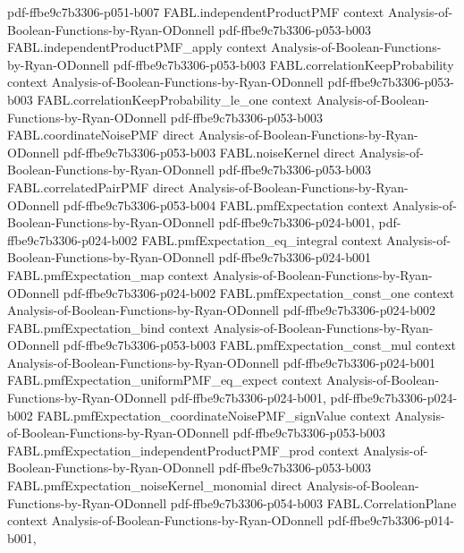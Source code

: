 \begin{theorem}
{    pdf-ffbe9c7b3306-p051-b007}
\proofstep
  {FABL.independentProductPMF}
  {context}
  {Analysis-of-Boolean-Functions-by-Ryan-ODonnell}
  {pdf-ffbe9c7b3306-p053-b003}
\proofstep
  {FABL.independentProductPMF_apply}
  {context}
  {Analysis-of-Boolean-Functions-by-Ryan-ODonnell}
  {pdf-ffbe9c7b3306-p053-b003}
\proofstep
  {FABL.correlationKeepProbability}
  {context}
  {Analysis-of-Boolean-Functions-by-Ryan-ODonnell}
  {pdf-ffbe9c7b3306-p053-b003}
\proofstep
  {FABL.correlationKeepProbability_le_one}
  {context}
  {Analysis-of-Boolean-Functions-by-Ryan-ODonnell}
  {pdf-ffbe9c7b3306-p053-b003}
\proofstep
  {FABL.coordinateNoisePMF}
  {direct}
  {Analysis-of-Boolean-Functions-by-Ryan-ODonnell}
  {pdf-ffbe9c7b3306-p053-b003}
\proofstep
  {FABL.noiseKernel}
  {direct}
  {Analysis-of-Boolean-Functions-by-Ryan-ODonnell}
  {pdf-ffbe9c7b3306-p053-b003}
\proofstep
  {FABL.correlatedPairPMF}
  {direct}
  {Analysis-of-Boolean-Functions-by-Ryan-ODonnell}
  {pdf-ffbe9c7b3306-p053-b004}
\proofstep
  {FABL.pmfExpectation}
  {context}
  {Analysis-of-Boolean-Functions-by-Ryan-ODonnell}
  {pdf-ffbe9c7b3306-p024-b001,
    pdf-ffbe9c7b3306-p024-b002}
\proofstep
  {FABL.pmfExpectation_eq_integral}
  {context}
  {Analysis-of-Boolean-Functions-by-Ryan-ODonnell}
  {pdf-ffbe9c7b3306-p024-b001}
\proofstep
  {FABL.pmfExpectation_map}
  {context}
  {Analysis-of-Boolean-Functions-by-Ryan-ODonnell}
  {pdf-ffbe9c7b3306-p024-b002}
\proofstep
  {FABL.pmfExpectation_const_one}
  {context}
  {Analysis-of-Boolean-Functions-by-Ryan-ODonnell}
  {pdf-ffbe9c7b3306-p024-b002}
\proofstep
  {FABL.pmfExpectation_bind}
  {context}
  {Analysis-of-Boolean-Functions-by-Ryan-ODonnell}
  {pdf-ffbe9c7b3306-p053-b003}
\proofstep
  {FABL.pmfExpectation_const_mul}
  {context}
  {Analysis-of-Boolean-Functions-by-Ryan-ODonnell}
  {pdf-ffbe9c7b3306-p024-b001}
\proofstep
  {FABL.pmfExpectation_uniformPMF_eq_expect}
  {context}
  {Analysis-of-Boolean-Functions-by-Ryan-ODonnell}
  {pdf-ffbe9c7b3306-p024-b001,
    pdf-ffbe9c7b3306-p024-b002}
\proofstep
  {FABL.pmfExpectation_coordinateNoisePMF_signValue}
  {context}
  {Analysis-of-Boolean-Functions-by-Ryan-ODonnell}
  {pdf-ffbe9c7b3306-p053-b003}
\proofstep
  {FABL.pmfExpectation_independentProductPMF_prod}
  {context}
  {Analysis-of-Boolean-Functions-by-Ryan-ODonnell}
  {pdf-ffbe9c7b3306-p053-b003}
\proofstep
  {FABL.pmfExpectation_noiseKernel_monomial}
  {direct}
  {Analysis-of-Boolean-Functions-by-Ryan-ODonnell}
  {pdf-ffbe9c7b3306-p054-b003}
\proofstep
  {FABL.CorrelationPlane}
  {context}
  {Analysis-of-Boolean-Functions-by-Ryan-ODonnell}
  {pdf-ffbe9c7b3306-p014-b001,
}
\end{theorem}
